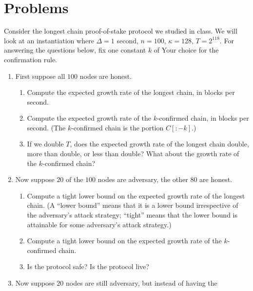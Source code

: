 \section*{Problems}
\begin{problems}
  \item Consider the longest chain proof-of-stake protocol we studied in class. We will
    look at an instantiation where $\Delta = 1$ second, $n = 100$, $\kappa = 128$,
    $T = 2^{118}$. For answering the questions below, fix one constant $k$ of Your
    choice for the confirmation rule.

    \begin{enumerate}
        \item First suppose all $100$ nodes are honest.
            \begin{enumerate}
                \item Compute the expected growth rate of the longest
                    chain, in blocks per second.
                \item Compute the expected growth rate of the
                    $k$-confirmed chain, in blocks per second. (The $k$-confirmed
                    chain is the portion $C[{:}{-}k]$.)
                \item If we double $T$, does the expected growth rate of
                    the longest chain double, more than double, or less than double?
                    What about the growth rate of the $k$-confirmed chain?
            \end{enumerate}
        \item Now suppose $20$ of the $100$ nodes are adversary, the other $80$ are
            honest.
            \begin{enumerate}
                \item Compute a tight lower bound on the expected growth
                    rate of the longest chain. (A ``lower bound'' means that it is a
                    lower bound irrespective of the adversary's attack strategy;
                    ``tight'' means that the lower bound is attainable for some
                    adversary's attack strategy.)
                \item Compute a tight lower bound on the expected growth
                    rate of the $k$-confirmed chain.
                \item Is the protocol safe? Is the protocol live?
            \end{enumerate}
        \item Now suppose $20$ nodes are still adversary, but instead of having the

\end{enumerate}
\end{problems}
